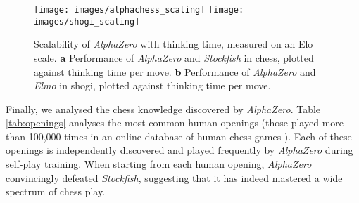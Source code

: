 \documentclass[12pt]{article}
\begin{document}
\begin{figure}
\texttt{[image: images/alphachess\_scaling]}
\texttt{[image: images/shogi\_scaling]}
\caption{
\label{fig:scalability}
Scalability of \emph{AlphaZero} with thinking time, measured on an Elo scale. 
\textbf{a} Performance of \emph{AlphaZero} and \emph{Stockfish} in chess, plotted against thinking time per move. 
\textbf{b} Performance of \emph{AlphaZero} and \emph{Elmo} in shogi, plotted against thinking time per move. 
}
\end{figure}

Finally, we analysed the chess knowledge discovered by \emph{AlphaZero}. Table \ref{tab:openings} analyses the most common human openings (those played more than 100,000 times in an online database of human chess games \cite{chess365}). Each of these openings is independently discovered and played frequently by \emph{AlphaZero} during self-play training. When starting from each human opening, \emph{AlphaZero} convincingly defeated \emph{Stockfish}, suggesting that it has indeed mastered a wide spectrum of chess play.
\end{document}
